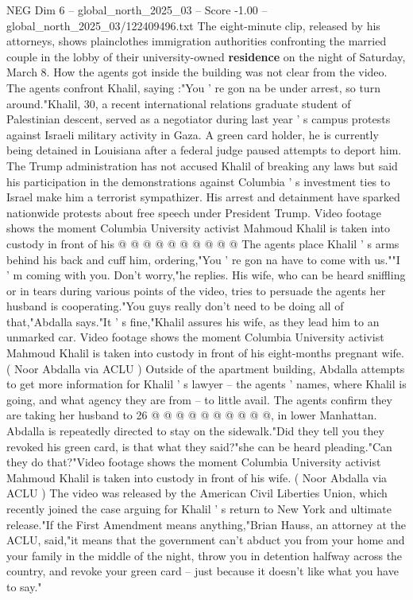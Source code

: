 \begin{textsample}{NEG Dim 6 – global\_north\_2025\_03 – Score -1.00 – global\_north\_2025\_03/122409496.txt}  \label{ex:f6_neg_234}
The eight-minute clip, released by his attorneys, shows plainclothes immigration authorities confronting the married couple in the lobby of their university-owned \textbf{residence} on the night of Saturday, March 8.
How the agents got inside the building was not clear from the video.
The agents confront Khalil, saying :"You ' re gon na be under arrest, so turn around."Khalil, 30, a recent international relations graduate student of Palestinian descent, served as a negotiator during last year ' s campus protests against Israeli military activity in Gaza.
A green card holder, he is currently being detained in Louisiana after a federal judge paused attempts to deport him.
The Trump administration has not accused Khalil of breaking any laws but said his participation in the demonstrations against Columbia ' s investment ties to Israel make him a terrorist sympathizer.
His arrest and detainment have sparked nationwide protests about free speech under President Trump.
Video footage shows the moment Columbia University activist Mahmoud Khalil is taken into custody in front of his @ @ @ @ @ @ @ @ @ @ The agents place Khalil ' s arms behind his back and cuff him, ordering,"You ' re gon na have to come with us.""I ' m coming with you.
Don't worry,"he replies.
His wife, who can be heard sniffling or in tears during various points of the video, tries to persuade the agents her husband is cooperating."You guys really don't need to be doing all of that,"Abdalla says."It ' s fine,"Khalil assures his wife, as they lead him to an unmarked car.
Video footage shows the moment Columbia University activist Mahmoud Khalil is taken into custody in front of his eight-months pregnant wife. ( Noor Abdalla via ACLU ) Outside of the apartment building, Abdalla attempts to get more information for Khalil ' s lawyer -- the agents ' names, where Khalil is going, and what agency they are from -- to little avail.
The agents confirm they are taking her husband to 26 @ @ @ @ @ @ @ @ @ @, in lower Manhattan.
Abdalla is repeatedly directed to stay on the sidewalk."Did they tell you they revoked his green card, is that what they said?"she can be heard pleading."Can they do that?"Video footage shows the moment Columbia University activist Mahmoud Khalil is taken into custody in front of his wife. ( Noor Abdalla via ACLU ) The video was released by the American Civil Liberties Union, which recently joined the case arguing for Khalil ' s return to New York and ultimate release."If the First Amendment means anything,"Brian Hauss, an attorney at the ACLU, said,"it means that the government can't abduct you from your home and your family in the middle of the night, throw you in detention halfway across the country, and revoke your green card -- just because it doesn't like what you have to say."

\end{textsample}
